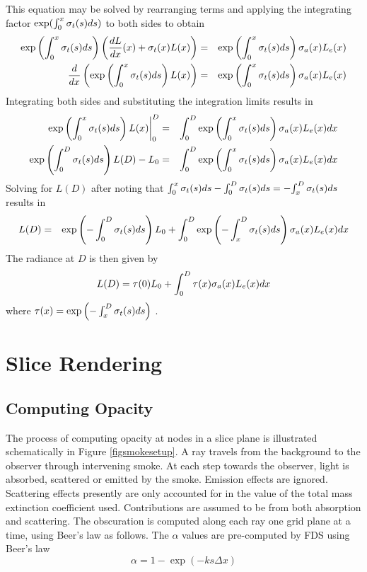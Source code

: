 This equation may be solved by rearranging terms and applying the
integrating factor $\exp(\int_0^x \sigma_t(s) ds)$ to both sides to
obtain
\begin{eqnarray*}
\exp\left({\int_0^x \sigma_t(s) ds}\right)\left(\frac{dL}{dx}(x)+\sigma_t(x) L(x)\right)&=&  \exp\left({\int_0^x \sigma_t(s) ds}\right)\sigma_a(x) L_e(x)\\
\frac{d}{dx}\left(\exp\left({\int_0^x \sigma_t(s) ds}\right) L(x)\right)&=& \exp\left({\int_0^x \sigma_t(s) ds}\right)\sigma_a(x) L_e(x)
\end{eqnarray*}
Integrating both sides and substituting the integration limits
results in
\begin{eqnarray*}
\left.\exp\left({\int_0^x \sigma_t(s) ds}\right) L(x)\right|_0^D&=& \int_0^D\exp\left({\int_0^x \sigma_t(s) ds}\right)\sigma_a(x) L_e(x) dx \\
\exp\left({\int_0^D \sigma_t(s) ds}\right) L(D)-L_0&=& \int_0^D\exp\left({\int_0^x \sigma_t(s) ds}\right)\sigma_a(x) L_e(x) dx
\end{eqnarray*}
Solving for $L(D)$ after noting that
${\int_0^x \sigma_t(s) ds}-{\int_0^D \sigma_t(s) ds}=-{\int_x^D \sigma_t(s) ds}$ results in
\begin{eqnarray*}
L(D)&=&\exp\left({-\int_0^D \sigma_t(s) ds}\right) L_0+ \int_0^D\exp\left({-\int_x^D \sigma_t(s) ds}\right)\sigma_a(x) L_e(x) dx\\
\end{eqnarray*}
The radiance at $D$ is then given by
\begin{equation}
 L(D)=\tau(0)L_0 + \int_0^D\tau(x)\sigma_a(x)L_e(x) dx
\end{equation}
where $\tau(x)=\exp\left({-\int_x^D \sigma_t(s) ds}\right)$ .

%
%

\section{Slice Rendering}


%
%

\subsection{Computing Opacity}
The process of computing opacity at nodes in a slice plane is illustrated schematically in Figure \ref{figsmokesetup}.
A ray travels from the background to the observer through intervening smoke.
At each step towards the observer, light is absorbed, scattered or emitted by the smoke.  Emission effects are ignored.  Scattering effects presently are only accounted for in the value of the total mass extinction coefficient used.  Contributions are assumed to be from both absorption and scattering.
The obscuration is computed along each ray one grid plane at a time, using Beer's law as follows.  The $\alpha$ values are pre-computed by FDS using Beer's
law~\cite{Siegel:2001}
\begin{equation}
\alpha=1-\exp(-ks\Delta x) \label{eq:alpha}
\end{equation}

